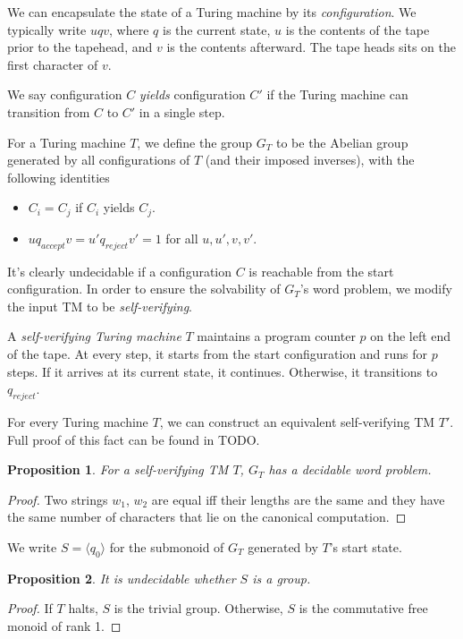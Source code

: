 \documentclass[10pt]{article} %
\newtheorem{proposition}{Proposition}
\newcommand{\defn}[1]{\textit{#1}}
\begin{document}
    We can encapsulate the state of a Turing machine by its \defn{configuration}. We typically write $u q v$, where $q$ is the current state, $u$ is the contents of the tape prior to the tapehead, and $v$ is the contents afterward. The tape heads sits on the first character of $v$. 

    We say configuration $C$ \defn{yields} configuration $C'$ if the Turing machine can transition from $C$ to $C'$ in a single step.

    For a Turing machine $T$, we define the group $G_T$ to be the Abelian group generated by all configurations of $T$ (and their imposed inverses), with the following identities
    \begin{itemize}
    \item $C_i = C_j$ if $C_i$ yields $C_j$.
    \item $uq_{accept}v = u'q_{reject}v' = 1$ for all $u, u', v, v'$.
    \end{itemize}

    It's clearly undecidable if a configuration $C$ is reachable from the start configuration. In order to ensure the solvability of $G_T$'s word problem, we modify the input TM to be \defn{self-verifying}. 

    A \defn{self-verifying Turing machine} $T$ maintains a program counter $p$ on the left end of the tape. At every step, it starts from the start configuration and runs for $p$ steps. If it arrives at its current state, it continues. Otherwise, it transitions to $q_{reject}$. 

    For every Turing machine $T$, we can construct an equivalent self-verifying TM $T'$. Full proof of this fact can be found in TODO.

    \begin{proposition}
    For a self-verifying TM $T$, $G_T$ has a decidable word problem.
    \end{proposition}
    \begin{proof}
    Two strings $w_1$, $w_2$ are equal iff their lengths are the same and they have the same number of characters that lie on the canonical computation.
    \end{proof}

    We write $S = \langle q_0 \rangle$ for the submonoid of $G_T$ generated by $T$'s start state.

    \begin{proposition}
    It is undecidable whether $S$ is a group.
    \end{proposition}
    \begin{proof}
    If $T$ halts, $S$ is the trivial group. Otherwise, $S$ is the commutative free monoid of rank 1.
    \end{proof}
\end{document}
